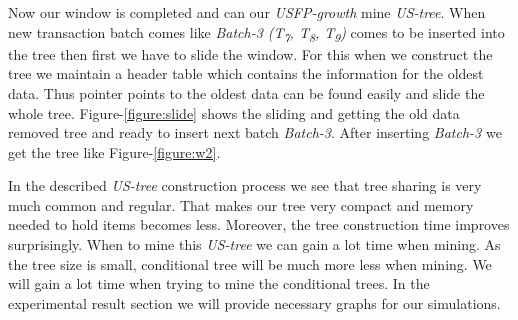 \documentclass[conference]{IEEEtran}
\begin{document}
    
    Now our window is completed and can our \emph{USFP-growth} mine \emph {US-tree}. When new transaction batch comes like \emph{Batch-3 (T\textsubscript{7}, T\textsubscript{8}, T\textsubscript{9})} comes to be inserted into the tree then first we have to slide the window. For this when we construct the tree we maintain a header table which contains the information for the oldest data. Thus pointer points to the oldest data can be found easily and slide the whole tree. Figure-\ref{figure:slide} shows the sliding and getting the old data removed tree and ready to insert next batch \emph{Batch-3}. After inserting \emph{Batch-3} we get the tree like Figure-\ref{figure:w2}. 
    
    In the described \emph{US-tree} construction process we see that tree sharing is very much common and regular. That makes our tree very compact and memory needed to hold items becomes less. Moreover, the tree construction time improves surprisingly. When to mine this \emph{US-tree} we can gain a lot time when mining. As the tree size is small, conditional tree will be much more less when mining. We will gain a lot time when trying to mine the conditional trees. In the experimental result section we will provide necessary graphs for our simulations.
\end{document}
